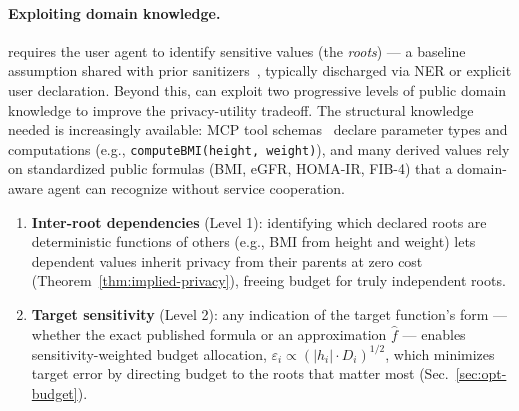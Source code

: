  


\paragraph{Exploiting domain knowledge.} 
\sysname{} requires the user agent to identify sensitive values (the \emph{roots}) --- a baseline assumption shared with prior sanitizers~\cite{chowdhury2025,wu2025capecontextawarepromptperturbation}, typically discharged via NER or explicit user declaration. Beyond this, \sysname{} can exploit two progressive levels of public domain knowledge to improve the privacy-utility tradeoff. The structural knowledge needed is increasingly available: MCP tool schemas~\cite{anthropic2024mcp} declare parameter types and computations (e.g., \texttt{computeBMI(height, weight)}), and many derived values rely on standardized public formulas (BMI, eGFR, HOMA-IR, FIB-4) that a domain-aware agent can recognize without service cooperation.
 
\begin{enumerate}
    \item \textbf{Inter-root dependencies} (Level 1): identifying which declared roots are deterministic functions of others (e.g., BMI from height and weight) lets dependent values inherit privacy from their parents at zero cost (Theorem~\ref{thm:implied-privacy}), freeing budget for truly independent roots.
    \item \textbf{Target sensitivity} (Level 2): any indication of the target function's form --- whether the exact published formula or an approximation $\hat{f}$ --- enables sensitivity-weighted budget allocation, $\varepsilon_i \propto (|h_i| \cdot D_i)^{1/2}$, which minimizes target error by directing budget to the roots that matter most (Sec.~\ref{sec:opt-budget}).
\end{enumerate}
 
